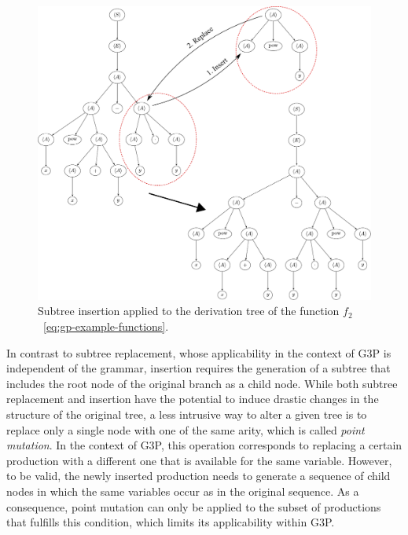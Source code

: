 \begin{figure}[ht]
	\centering
	\includegraphics[scale=0.474]{figures/trees/subtree_insertion_mutation.pdf}
	\caption{Subtree insertion applied to the derivation tree of the function $f_2$~\eqref{eq:gp-example-functions}.}
	\label{fig:gp-insertion-mutation}
\end{figure}
In contrast to subtree replacement, whose applicability in the context of G3P is independent of the grammar, insertion requires the generation of a subtree that includes the root node of the original branch as a child node.
While both subtree replacement and insertion have the potential to induce drastic changes in the structure of the original tree, a less intrusive way to alter a given tree is to replace only a single node with one of the same arity, which is called \emph{point mutation}.
In the context of G3P, this operation corresponds to replacing a certain production with a different one that is available for the same variable.
However, to be valid, the newly inserted production needs to generate a sequence of child nodes in which the same variables occur as in the original sequence.
As a consequence, point mutation can only be applied to the subset of productions that fulfills this condition, which limits its applicability within G3P.

